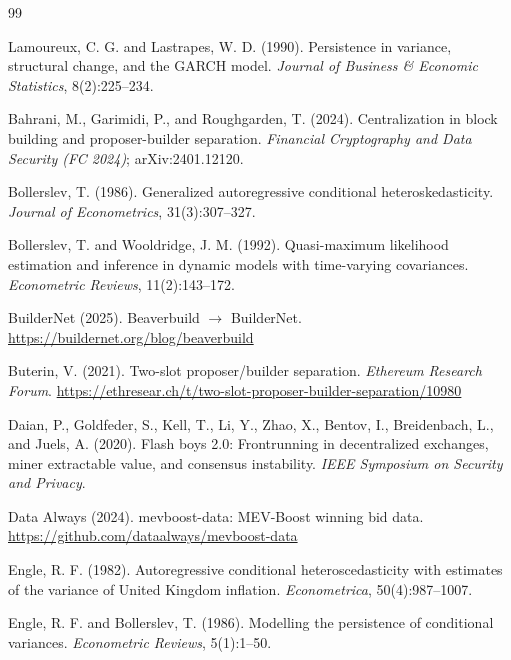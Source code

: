 \documentclass[11pt]{article}
\begin{document}


\begin{thebibliography}{99}

Lamoureux, C. G. and Lastrapes, W. D. (1990).
Persistence in variance, structural change, and the GARCH model.
\textit{Journal of Business \& Economic Statistics}, 8(2):225--234.

Bahrani, M., Garimidi, P., and Roughgarden, T. (2024).
Centralization in block building and proposer-builder separation.
\textit{Financial Cryptography and Data Security (FC 2024)}; arXiv:2401.12120.

Bollerslev, T. (1986).
Generalized autoregressive conditional heteroskedasticity.
\textit{Journal of Econometrics}, 31(3):307--327.

Bollerslev, T. and Wooldridge, J. M. (1992).
Quasi-maximum likelihood estimation and inference in dynamic models with time-varying covariances.
\textit{Econometric Reviews}, 11(2):143--172.

BuilderNet (2025).
Beaverbuild $\rightarrow$ BuilderNet.
\url{https://buildernet.org/blog/beaverbuild}

Buterin, V. (2021).
Two-slot proposer/builder separation.
\textit{Ethereum Research Forum}.
\url{https://ethresear.ch/t/two-slot-proposer-builder-separation/10980}

Daian, P., Goldfeder, S., Kell, T., Li, Y., Zhao, X., Bentov, I.,
Breidenbach, L., and Juels, A. (2020).
Flash boys 2.0: Frontrunning in decentralized exchanges, miner extractable
value, and consensus instability.
\textit{IEEE Symposium on Security and Privacy}.

Data Always (2024).
mevboost-data: MEV-Boost winning bid data.
\url{https://github.com/dataalways/mevboost-data}

Engle, R. F. (1982).
Autoregressive conditional heteroscedasticity with estimates of the variance
of United Kingdom inflation.
\textit{Econometrica}, 50(4):987--1007.

Engle, R. F. and Bollerslev, T. (1986).
Modelling the persistence of conditional variances.
\textit{Econometric Reviews}, 5(1):1--50.


\end{thebibliography}
\end{document}
